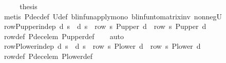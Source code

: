 \begin{isabellebody}
\ \ \isamarkupfalse%
\ \isamarkupfalse%
\ {\isacharquery}{\kern0pt}thesis\isanewline
\ \ \ \ \isamarkupfalse%
\ {\isacharparenleft}{\kern0pt}metis\ P{\isacharunderscore}{\kern0pt}dec{\isacharunderscore}{\kern0pt}def\ {\isasymP}\isactrlsub U{\isacharunderscore}{\kern0pt}def\ blinfun{\isacharunderscore}{\kern0pt}apply{\isacharunderscore}{\kern0pt}mono\ blinfun{\isacharunderscore}{\kern0pt}to{\isacharunderscore}{\kern0pt}matrix{\isacharunderscore}{\kern0pt}inv\ nonneg{\isacharunderscore}{\kern0pt}{\isasymP}\isactrlsub U{\isacharparenright}{\kern0pt}\isanewline
{}\isamarkupfalse%
%
\endisatagproof
{\isafoldproof}%
%
\isadelimproof
\isanewline
%
\endisadelimproof
\isanewline
{}\isamarkupfalse%
\ row{\isacharunderscore}{\kern0pt}P{\isacharunderscore}{\kern0pt}upper{\isacharunderscore}{\kern0pt}indep{\isacharcolon}{\kern0pt}\ {\isachardoublequoteopen}d\ s\ {\isacharequal}{\kern0pt}\ d{\isacharprime}{\kern0pt}\ s\ {\isasymLongrightarrow}\ row\ s\ {\isacharparenleft}{\kern0pt}P{\isacharunderscore}{\kern0pt}upper\ d{\isacharparenright}{\kern0pt}\ {\isacharequal}{\kern0pt}\ row\ s\ {\isacharparenleft}{\kern0pt}P{\isacharunderscore}{\kern0pt}upper\ d{\isacharprime}{\kern0pt}{\isacharparenright}{\kern0pt}{\isachardoublequoteclose}\isanewline
%
\isadelimproof
\ \ %
\endisadelimproof
%
\isatagproof
{}\isamarkupfalse%
\ row{\isacharunderscore}{\kern0pt}def\ P{\isacharunderscore}{\kern0pt}dec{\isacharunderscore}{\kern0pt}elem\ P{\isacharunderscore}{\kern0pt}upper{\isacharunderscore}{\kern0pt}def\isanewline
\ \ \isamarkupfalse%
\ auto%
\endisatagproof
{\isafoldproof}%
%
\isadelimproof
\isanewline
%
\endisadelimproof
\isanewline
{}\isamarkupfalse%
\ row{\isacharunderscore}{\kern0pt}P{\isacharunderscore}{\kern0pt}lower{\isacharunderscore}{\kern0pt}indep{\isacharcolon}{\kern0pt}\ {\isachardoublequoteopen}d\ s\ {\isacharequal}{\kern0pt}\ d{\isacharprime}{\kern0pt}\ s\ {\isasymLongrightarrow}\ row\ s\ {\isacharparenleft}{\kern0pt}P{\isacharunderscore}{\kern0pt}lower\ d{\isacharparenright}{\kern0pt}\ {\isacharequal}{\kern0pt}\ row\ s\ {\isacharparenleft}{\kern0pt}P{\isacharunderscore}{\kern0pt}lower\ d{\isacharprime}{\kern0pt}{\isacharparenright}{\kern0pt}{\isachardoublequoteclose}\isanewline
%
\isadelimproof
\ \ %
\endisadelimproof
%
\isatagproof
{}\isamarkupfalse%
\ row{\isacharunderscore}{\kern0pt}def\ P{\isacharunderscore}{\kern0pt}dec{\isacharunderscore}{\kern0pt}elem\ P{\isacharunderscore}{\kern0pt}lower{\isacharunderscore}{\kern0pt}def\isanewline

\end{isabellebody}
